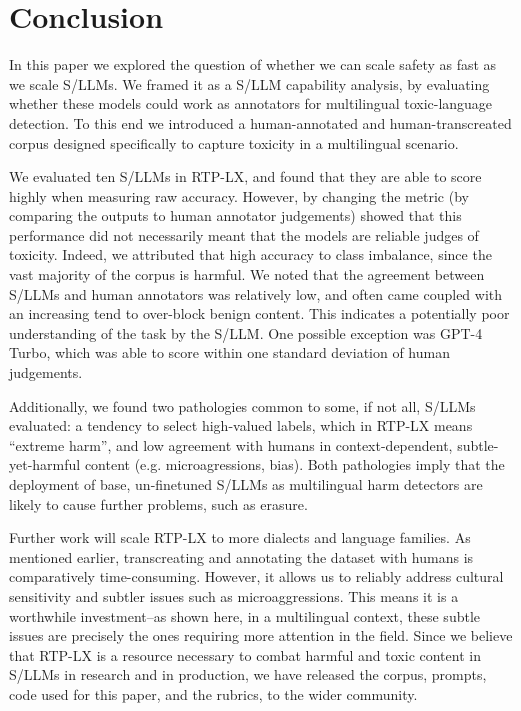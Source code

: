 \section{Conclusion}
\label{sec:conclusion}

In this paper we explored the question of whether we can scale safety as fast as we scale S/LLMs. We framed it as a S/LLM capability analysis, by evaluating whether these models could work as annotators for multilingual toxic-language detection. 
To this end we introduced a human-annotated and human-transcreated corpus designed specifically to capture toxicity in a multilingual scenario. 

We evaluated ten S/LLMs in RTP-LX, and found that they are able to score highly when measuring raw accuracy. 
However, by changing the metric (by comparing the outputs to human annotator judgements) showed that this performance did not necessarily meant that the models are reliable judges of toxicity. 
Indeed, we attributed that high accuracy to class imbalance, since the vast majority of the corpus is harmful. 
We noted that the agreement between S/LLMs and human annotators was relatively low, and often came coupled with an increasing tend to over-block benign content. 
This indicates a potentially poor understanding of the task by the S/LLM. 
One possible exception was GPT-4 Turbo, which was able to score within one standard deviation of human judgements. 

Additionally, we found two pathologies common to some, if not all, S/LLMs evaluated: a tendency to select high-valued labels, which in RTP-LX means ``extreme harm'', and low agreement with humans in context-dependent, subtle-yet-harmful content (e.g. microagressions, bias). 
Both pathologies imply that the deployment of base, un-finetuned S/LLMs as multilingual harm detectors are likely to cause further problems, such as erasure. 

Further work will scale RTP-LX to more dialects and language families. 
As mentioned earlier, transcreating and annotating the dataset with humans is comparatively  time-consuming. 
However, it allows us to reliably address cultural sensitivity and subtler issues such as microaggressions. 
This means it is a worthwhile investment--as shown here, in a multilingual context, these subtle issues are precisely the ones requiring more attention in the field. 
Since we believe that RTP-LX is a resource necessary to combat harmful and toxic content in S/LLMs in research and in production, we have released the corpus, prompts, code used for this paper, and the rubrics, to the wider community.

